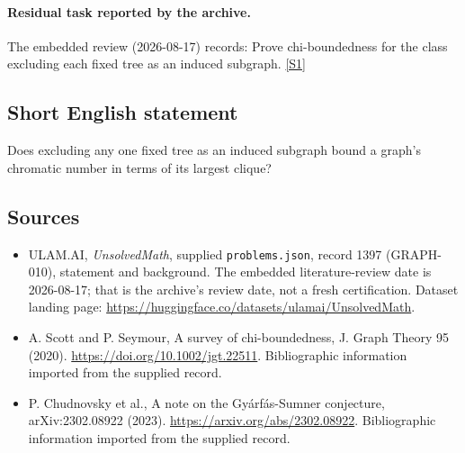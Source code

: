 \documentclass[11pt,a4paper]{article}
\newcommand{\sref}[2]{\hyperlink{source:#1:#2}{[S#2]}}
\begin{document}
\paragraph{Residual task reported by the archive.}

The embedded review (2026-08-17) records: Prove chi-boundedness for the class excluding each fixed tree as an induced subgraph. \sref{1397}{1}

\subsection{Short English statement}

Does excluding any one fixed tree as an induced subgraph bound a graph’s chromatic number in terms of its largest clique?

\subsection{Sources}

{\small

\begin{itemize}

\item[\hypertarget{source:1397:1}{S1}] ULAM.AI, \emph{UnsolvedMath}, supplied \texttt{problems.json}, record 1397 (GRAPH-010), statement and background. The embedded literature-review date is 2026-08-17; that is the archive’s review date, not a fresh certification. Dataset landing page: \url{https://huggingface.co/datasets/ulamai/UnsolvedMath}.

\item[\hypertarget{source:1397:2}{S2}] A. Scott and P. Seymour, A survey of chi-boundedness, J. Graph Theory 95 (2020). \url{https://doi.org/10.1002/jgt.22511}. Bibliographic information imported from the supplied record.

\item[\hypertarget{source:1397:3}{S3}] P. Chudnovsky et al., A note on the Gyárfás-Sumner conjecture, arXiv:2302.08922 (2023). \url{https://arxiv.org/abs/2302.08922}. Bibliographic information imported from the supplied record.

\end{itemize}

}

\label{end:1397}
\end{document}
